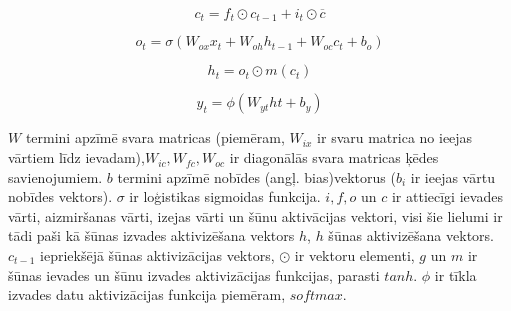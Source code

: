 \documentclass[12pt,paper=A4]{report}
\begin{document}
\begin{equation} c_t = f_t \odot c_{t-1} + i_t \odot \overline{c}
\label{eq:Šūnas stāvokļa vienādojums}
\end{equation}

\begin{equation} o_t = \sigma (W_{ox}x_t + W_{oh}h_{t-1} + W_{oc}c_t + b_o) \label{eq:Izvades vārtu vienādojums}
\end{equation}

\begin{equation} h_t = o_t \odot m(c_t)
\label{eq:Slēptā stāvokļa vienādojums}
\end{equation}

\begin{equation}
y_t = \phi(W_{yt}ht+b_y)
\label{eq:Izvades datu}
\end{equation}


$W$ termini apzīmē svara matricas (piemēram, $W_{ix}$ ir svaru matrica no ieejas vārtiem līdz ievadam),$W_{ic}, W_{fc}, W_{oc}$ ir diagonālās svara matricas ķēdes savienojumiem. $b$ termini apzīmē nobīdes (angļ. bias)vektorus ($b_i$ ir ieejas vārtu nobīdes vektors). $\sigma$ ir loģistikas sigmoidas funkcija. $i, f, o$ un $c$ ir attiecīgi ievades vārti, aizmiršanas vārti, izejas vārti un šūnu aktivācijas vektori, visi šie lielumi ir tādi paši kā šūnas izvades aktivizēšana vektors $h$, $h$ šūnas aktivizēšana vektors.
$c_{t-1}$ iepriekšējā šūnas aktivizācijas vektors, $\odot$ ir vektoru elementi, $g$ un $m$ ir šūnas ievades un šūnu izvades aktivizācijas funkcijas, parasti $tanh$.
$\phi$ ir tīkla izvades datu aktivizācijas funkcija piemēram, $softmax$. 
\end{document}

